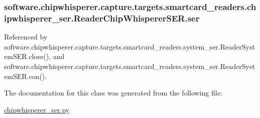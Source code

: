 \subsubsection[{ser}]{\setlength{\rightskip}{0pt plus 5cm}software.\+chipwhisperer.\+capture.\+targets.\+smartcard\+\_\+readers.\+chipwhisperer\+\_\+ser.\+Reader\+Chip\+Whisperer\+S\+E\+R.\+ser}\label{classsoftware_1_1chipwhisperer_1_1capture_1_1targets_1_1smartcard__readers_1_1chipwhisperer__ser_1_1ReaderChipWhispererSER_aa5cdb654f42acac66b5a62299077a963}


Referenced by software.\+chipwhisperer.\+capture.\+targets.\+smartcard\+\_\+readers.\+system\+\_\+ser.\+Reader\+System\+S\+E\+R.\+close(), and software.\+chipwhisperer.\+capture.\+targets.\+smartcard\+\_\+readers.\+system\+\_\+ser.\+Reader\+System\+S\+E\+R.\+con().



The documentation for this class was generated from the following file\+:\begin{DoxyCompactItemize}
\item 
\hyperlink{chipwhisperer__ser_8py}{chipwhisperer\+\_\+ser.\+py}\end{DoxyCompactItemize}
